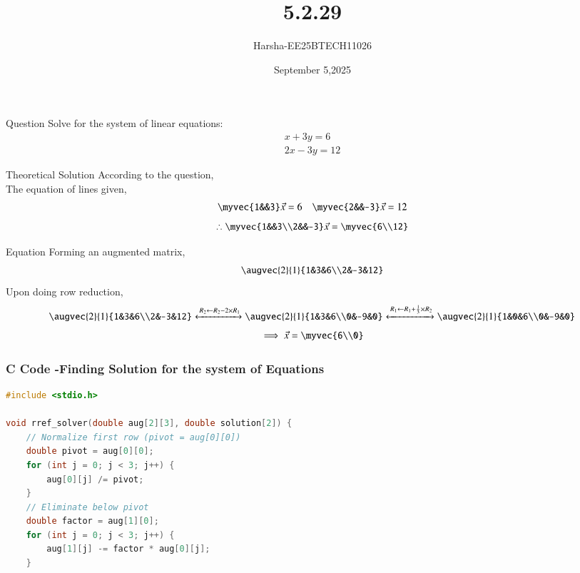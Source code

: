 \documentclass{beamer}
\title %
{5.2.29}
\date{September 5,2025}
\author %
{Harsha-EE25BTECH11026}
\begin{document}
\frame{\titlepage}


\begin{frame}{Question}
Solve for the system of linear equations:
\begin{align*}
    x+3y=6\\
    2x-3y=12
\end{align*}

\end{frame}

\begin{frame}{Theoretical Solution}
According to the question,\\
The equation of lines given,
\begin{align}
    \myvec{1&&3}\vec{x}=6 \quad \myvec{2&&-3}\vec{x}=12
\end{align}
\begin{align}
    \therefore \myvec{1&&3\\2&&-3}\vec{x}=\myvec{6\\12}
\end{align}
\end{frame}

\begin{frame}{Equation}
Forming an augmented matrix,
\begin{align}
    \augvec{2}{1}{1&3&6\\2&-3&12}
\end{align}
Upon doing row reduction,
\begin{align}
\begin{aligned}
     \augvec{2}{1}{1&3&6\\2&-3&12}
     \xleftrightarrow{\,R_2 \gets R_2- 2 \times R_1}
     \augvec{2}{1}{1&3&6\\0&-9&0}  
     \xleftrightarrow{\,R_1 \gets R_1+ \frac{1}{3} \times R_2}
     \augvec{2}{1}{1&0&6\\0&-9&0}
\end{aligned}
\end{align}
\begin{align}
    \implies \vec{x}=\myvec{6\\0}
\end{align}
\end{frame}


\begin{frame}[fragile]
    \frametitle{C Code -Finding Solution for the system of Equations}

    \begin{lstlisting}[language=C]
#include <stdio.h>

void rref_solver(double aug[2][3], double solution[2]) {
    // Normalize first row (pivot = aug[0][0])
    double pivot = aug[0][0];
    for (int j = 0; j < 3; j++) {
        aug[0][j] /= pivot;
    }
    // Eliminate below pivot
    double factor = aug[1][0];
    for (int j = 0; j < 3; j++) {
        aug[1][j] -= factor * aug[0][j];
    }



    \end{lstlisting}
\end{frame}
\end{document}
